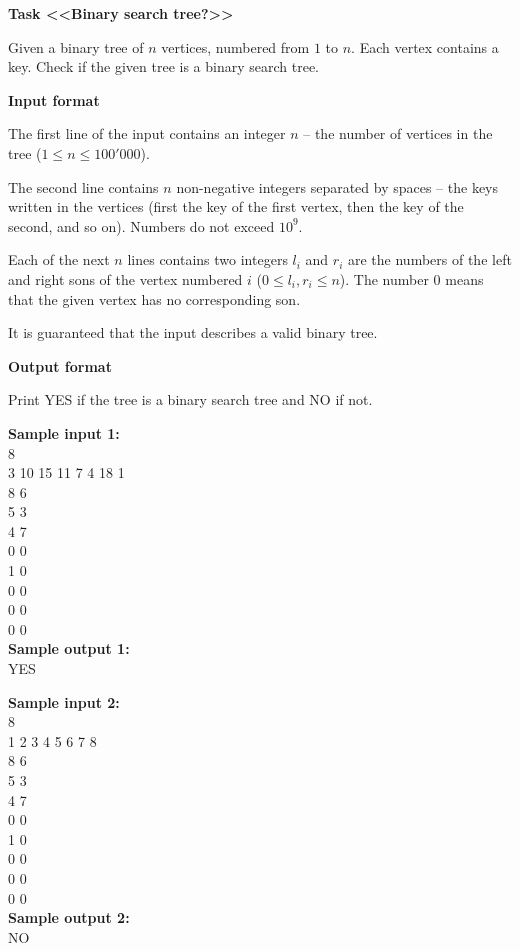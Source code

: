 \documentclass[a4paper]{article}
\begin{document}
\textbf{Task <<Binary search tree?>>}

\SPACE

Given a binary tree of $n$ vertices, numbered from $1$ to $n$. Each vertex contains a key. Check if the given tree is a binary search tree.

\SPACE

\textbf{Input format}

The first line of the input contains an integer $n$ -- the number of vertices in the tree ($1 \le n \le 100'000$).

The second line contains $n$ non-negative integers separated by spaces -- the keys written in the vertices (first the key of the first vertex, then the key of the second, and so on). Numbers do not exceed $10^9$.

Each of the next $n$ lines contains two integers $l_i$ and $r_i$ are the numbers of the left and right sons of the vertex numbered $i$ ($0 \le l_i, r_i \le n$). The number $0$ means that the given vertex has no corresponding son.

It is guaranteed that the input describes a valid binary tree.

\SPACE

\textbf{Output format}

Print YES if the tree is a binary search tree and NO if not.

\LINE

\noindent \textbf{Sample input 1:}\\
8\\
3 10 15 11 7 4 18 1\\
8 6\\
5 3\\
4 7\\
0 0\\
1 0\\
0 0\\
0 0\\
0 0\\

\noindent \textbf{Sample output 1:}\\
YES\\

\SPACE

\noindent \textbf{Sample input 2:}\\
8\\
1 2 3 4 5 6 7 8\\
8 6\\
5 3\\
4 7\\
0 0\\
1 0\\
0 0\\
0 0\\
0 0\\

\noindent \textbf{Sample output 2:}\\
NO\\
\end{document}
